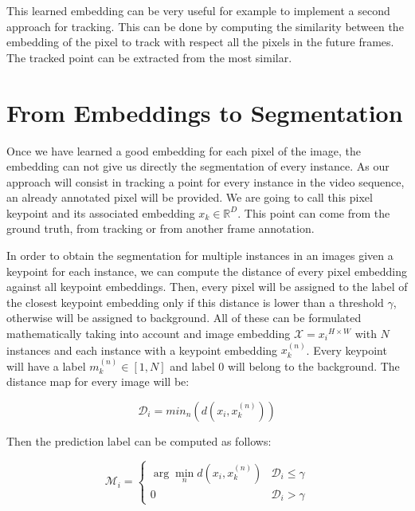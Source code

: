 This learned embedding can be very useful for example to implement a second approach for tracking.
This can be done by computing the similarity between the embedding of the pixel to track with respect all the pixels in the future frames.
The tracked point can be extracted from the most similar.



\section{From Embeddings to Segmentation}
\label{sec:methods:embeddingsegmentation}

Once we have learned a good embedding for each pixel of the image, the embedding can not give us directly the segmentation of every instance.
As our approach will consist in tracking a point for every instance in the video sequence, an already annotated pixel will be provided.
We are going to call this pixel keypoint and its associated embedding $x_k \in \mathbb{R}^D$.
This point can come from the ground truth, from tracking or from another frame annotation.

In order to obtain the segmentation for multiple instances in an images given a keypoint for each instance, we can compute the distance of every pixel embedding against all keypoint embeddings.
Then, every pixel will be assigned to the label of the closest keypoint embedding only if this distance is lower than a threshold $\gamma$, otherwise will be assigned to background.
All of these can be formulated mathematically taking into account and image embedding $\mathcal{X} = {x_i}^{H \times W}$ with $N$ instances and each instance with a keypoint embedding $x_k^{(n)}$.
Every keypoint will have a label $m_k^{(n)} \in [1, N]$ and label $0$ will belong to the background.
The distance map for every image will be:

\begin{equation}
  \mathcal{D}_i = min_n \left( d(x_i, x_k^{(n)}) \right)
\end{equation}

Then the prediction label can be computed as follows:

\begin{equation}
  \mathcal{M}_i = \begin{cases}
      \arg\min_n d(x_i, x_k^{(n)}) & \mathcal{D}_i \leq \gamma \\
      0 & \mathcal{D}_i > \gamma
   \end{cases}
\end{equation}

